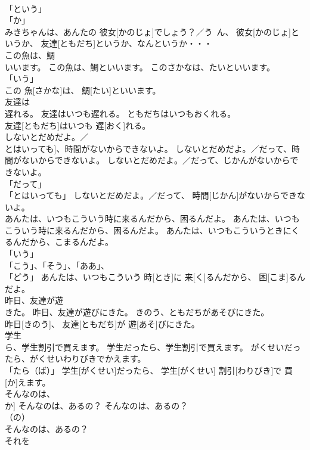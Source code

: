 \documentclass[8pt]{extreport}
\begin{document}
\begin{CJK}{UTF8}{min}
\\	「という」 
\\	「か」 
\\	みきちゃんは、あんたの 彼女[かのじょ]でしょう？／う~ん、 彼女[かのじょ]というか、 友達[ともだち]というか、なんというか・・・		
\\	この魚は、鯛
\\	いいます。	この魚は、鯛といいます。	このさかなは、たいといいます。	
\\	「いう」 
\\	この 魚[さかな]は、 鯛[たい]といいます。		
\\	友達は
\\	遅れる。	友達はいつも遅れる。	ともだちはいつもおくれる。	
\\	友達[ともだち]はいつも 遅[おく]れる。		
\\	しないとだめだよ。／
\\	とはいっても]、時間がないからできないよ。	しないとだめだよ。／だって、時間がないからできないよ。	しないとだめだよ。／だって、じかんがないからできないよ。	
\\	「だって」 
\\	「とはいっても」	しないとだめだよ。／だって、 時間[じかん]がないからできないよ。		
\\	あんたは、いつもこういう時に来るんだから、困るんだよ。	あんたは、いつもこういう時に来るんだから、困るんだよ。	あんたは、いつもこういうときにくるんだから、こまるんだよ。	
\\	「いう」 
\\	「こう」、「そう」、「ああ」、
\\	「どう」	あんたは、いつもこういう 時[とき]に 来[く]るんだから、 困[こま]るんだよ。		
\\	昨日、友達が遊
\\	きた。	昨日、友達が遊びにきた。	きのう、ともだちがあそびにきた。	
\\	昨日[きのう]、 友達[ともだち]が 遊[あそ]びにきた。		
\\	学生
\\	ら、学生割引で買えます。	学生だったら、学生割引で買えます。	がくせいだったら、がくせいわりびきでかえます。	
\\	「たら（ば）」	学生[がくせい]だったら、 学生[がくせい] 割引[わりびき]で 買[か]えます。		
\\	そんなのは、
\\	か]	そんなのは、あるの？	そんなのは、あるの？	
\\	（の）
\\	そんなのは、あるの？		
\\	それを

\end{CJK}
\end{document}
